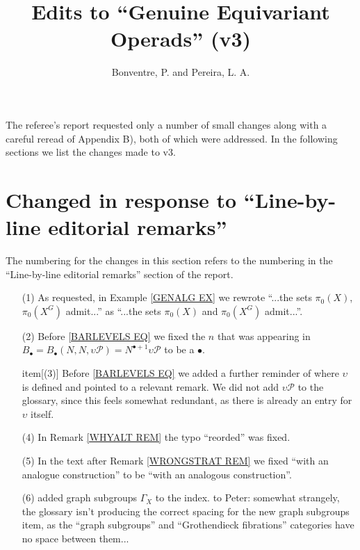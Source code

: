 \documentclass{article}
\begin{document}
 
 
\title{Edits to ``Genuine Equivariant Operads'' (v3)
\\[12pt]} %
 
\author{Bonventre, P. and Pereira, L. A.}
 
\maketitle

The referee's report requested only a number of small changes along with a careful reread of Appendix B),
both of which were addressed. In the following sections we list the changes made to v3.


\section{Changed in response to ``Line-by-line editorial remarks''}

The numbering for the changes in this section refers to the numbering in the ``Line-by-line editorial remarks'' section of the report.

\begin{itemize}

\item[(1)] As requested, in Example \ref{GENALG EX} we rewrote ``...the sets $\pi_0(X)$, $\pi_0(X^G)$ admit...'' as ``...the sets $\pi_0(X)$ and $\pi_0(X^G)$ admit...''.

\item[(2)] Before \eqref{BARLEVELS EQ} we
fixed the $n$ that was appearing in $B_{\bullet} = 
B_{\bullet}(N,N,\upsilon \mathcal{P})
= N^{\bullet+1} \upsilon \mathcal{P}$
to be a $\bullet$.

item[(3)] Before \eqref{BARLEVELS EQ} we added a further reminder of where $\upsilon$ is defined and pointed to a relevant remark. We did not add $\upsilon \mathcal{P}$ to the glossary, since this feels somewhat redundant, as there is already an entry for $\upsilon$ itself.


\item[(4)] In Remark \ref{WHYALT REM} the typo ``reorded'' was fixed.

\item[(5)]
In the text after Remark \ref{WRONGSTRAT REM} we fixed
``with an analogue construction'' to be 
``with an analogous construction''.

\item[(6)] added graph subgroups $\Gamma_X$ to the index. {\color{red} to Peter: somewhat strangely, the glossary isn't producing the correct spacing for the new graph subgroups item, as the ``graph subgroups'' and ``Grothendieck fibrations'' categories have no space between them...}

\end{itemize}









{}


\end{document}
